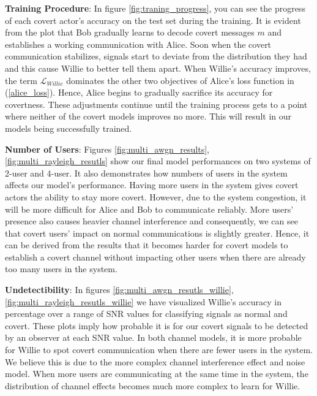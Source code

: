 \textbf{Training Procedure}: In figure \ref{fig:traning_progress}, you can see the progress of each covert actor's accuracy on the test set during the training. It is evident from the plot that Bob gradually learns to decode covert messages \(m\) and establishes a working communication with Alice. Soon when the covert communication stabilizes, signals start to deviate from the distribution they had and this cause Willie to better tell them apart. When Willie's accuracy improves, the term \(\mathcal{L}_{Willie}\) dominates the other two objectives of Alice's loss function in (\ref{alice_loss}). Hence, Alice begins to gradually sacrifice its accuracy for covertness. These adjustments continue until the training process gets to a point where neither of the covert models improves no more. This will result in our models being successfully trained.


\textbf{Number of Users}: Figures \ref{fig:multi_awgn_results}, \ref{fig:multi_rayleigh_resutls} show our final model performances on two systems of 2-user and 4-user. It also demonstrates how numbers of users in the system affects our model's performance. Having more users in the system gives covert actors the ability to stay more covert. However, due to the system congestion, it will be more difficult for Alice and Bob to communicate reliably. More users' presence also causes heavier channel interference and consequently, we can see that covert users' impact on normal communications is slightly greater. Hence, it can be derived from the results that it becomes harder for covert models to establish a covert channel without impacting other users when there are already too many users in the system.


\textbf{Undetectibility}: In figures \ref{fig:multi_awgn_resutls_willie}, \ref{fig:multi_rayleigh_resutls_willie} we have visualized Willie's accuracy in percentage over a range of SNR values for classifying signals as normal and covert. These plots imply how probable it is for our covert signals to be detected by an observer at each SNR value. In both channel models, it is more probable for Willie to spot covert communication when there are fewer users in the system. We believe this is due to the more complex channel interference effect and noise model. When more users are communicating at the same time in the system, the distribution of channel effects becomes much more complex to learn for Willie.

